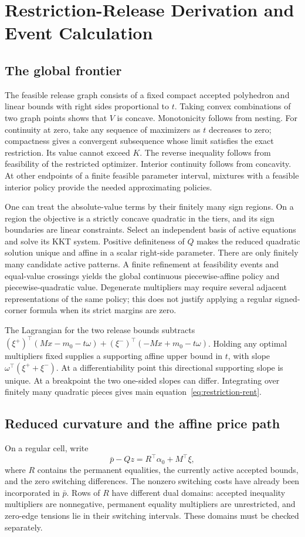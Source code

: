 \documentclass[11pt,letterpaper]{article}
\theoremstyle{definition}\newtheorem{remark}[theorem]{Remark}
\begin{document}
\section{Restriction-Release Derivation and Event Calculation}\label{ec:release}
\subsection{The global frontier}
The feasible release graph consists of a fixed compact accepted polyhedron and linear bounds with right sides proportional to $t$. Taking convex combinations of two graph points shows that $V$ is concave. Monotonicity follows from nesting. For continuity at zero, take any sequence of maximizers as $t$ decreases to zero; compactness gives a convergent subsequence whose limit satisfies the exact restriction. Its value cannot exceed $K$. The reverse inequality follows from feasibility of the restricted optimizer. Interior continuity follows from concavity. At other endpoints of a finite feasible parameter interval, mixtures with a feasible interior policy provide the needed approximating policies.

One can treat the absolute-value terms by their finitely many sign regions. On a region the objective is a strictly concave quadratic in the tiers, and its sign boundaries are linear constraints. Select an independent basis of active equations and solve its KKT system. Positive definiteness of $Q$ makes the reduced quadratic solution unique and affine in a scalar right-side parameter. There are only finitely many candidate active patterns. A finite refinement at feasibility events and equal-value crossings yields the global continuous piecewise-affine policy and piecewise-quadratic value. Degenerate multipliers may require several adjacent representations of the same policy; this does not justify applying a regular signed-corner formula when its strict margins are zero.

The Lagrangian for the two release bounds subtracts
$(\xi^+)^\top(Mx-m_0-t\omega)+(\xi^-)^\top(-Mx+m_0-t\omega)$.
Holding any optimal multipliers fixed supplies a supporting affine upper bound in $t$, with slope $\omega^\top(\xi^++\xi^-)$. At a differentiability point this directional supporting slope is unique. At a breakpoint the two one-sided slopes can differ. Integrating over finitely many quadratic pieces gives main equation~\eqref{eq:restriction-rent}.

\subsection{Reduced curvature and the affine price path}
On a regular cell, write
\[
 \bar p-Qz=R^\top\alpha_0+M^\top\xi,
\]
where $R$ contains the permanent equalities, the currently active accepted bounds, and the zero switching differences. The nonzero switching costs have already been incorporated in $\bar p$. Rows of $R$ have different dual domains: accepted inequality multipliers are nonnegative, permanent equality multipliers are unrestricted, and zero-edge tensions lie in their switching intervals. These domains must be checked separately.
\end{document}
